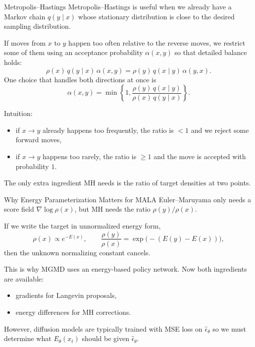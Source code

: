 \documentclass[aspectratio=169,11pt]{beamer}
\begin{document}
\begin{frame}{Metropolis--Hastings}
\small
Metropolis--Hastings is useful when we already have a Markov chain $q(y\mid x)$ whose stationary distribution is close to the desired sampling distribution.

\medskip
If moves from $x$ to $y$ happen too often relative to the reverse moves, we restrict some of them using an acceptance probability $\alpha(x,y)$ so that detailed balance holds:
\[
\rho(x)\,q(y\mid x)\,\alpha(x,y)
=
\rho(y)\,q(x\mid y)\,\alpha(y,x).
\]
One choice that handles both directions at once is
\[
\alpha(x,y)=\min\!\left\{1,\frac{\rho(y)\,q(x\mid y)}{\rho(x)\,q(y\mid x)}\right\}.
\]

\medskip
Intuition:
\begin{itemize}
  \item if $x\to y$ already happens too frequently, the ratio is $<1$ and we reject some forward moves,
  \item if $x\to y$ happens too rarely, the ratio is $\ge 1$ and the move is accepted with probability $1$.
\end{itemize}
The only extra ingredient MH needs is the ratio of target densities at two points.
\end{frame}

\begin{frame}{Why Energy Parameterization Matters for MALA}
\small
Euler--Maruyama only needs a score field $\nabla \log \rho(x)$, but MH needs the ratio $\rho(y)/\rho(x)$.

 \medskip
 If we write the target in unnormalized energy form,
 \[
 \rho(x)\propto e^{-E(x)},
 \qquad
 \frac{\rho(y)}{\rho(x)} = \exp\bigl(-(E(y)-E(x))\bigr),
 \]
 then the unknown normalizing constant cancels.

 \medskip
This is why MGMD uses an energy-based policy network. Now both ingredients are available:
  \begin{itemize}
    \item gradients for Langevin proposals,
    \item energy differences for MH corrections.
  \end{itemize}
  However, diffusion models are typically trained with MSE loss on $\hat\epsilon_\theta$ so we must determine what $E_\theta(x_t)$ should be given $\hat\epsilon_\theta$.
 \end{frame}
\end{document}
